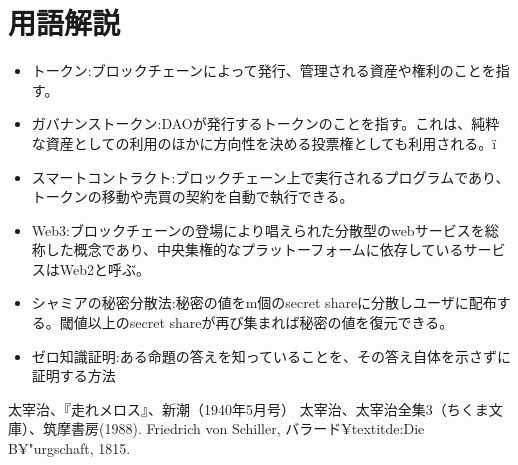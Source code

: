 \documentclass[twocolumn,a4j]{jarticle}
\begin{document}
\section{用語解説}
\begin{itemize}
  \item トークン:ブロックチェーンによって発行、管理される資産や権利のことを指す。
  \item ガバナンストークン:DAOが発行するトークンのことを指す。これは、純粋な資産としての利用のほかに方向性を決める投票権としても利用される。ï
  \item スマートコントラクト:ブロックチェーン上で実行されるプログラムであり、トークンの移動や売買の契約を自動で執行できる。
  \item Web3:ブロックチェーンの登場により唱えられた分散型のwebサービスを総称した概念であり、中央集権的なプラットーフォームに依存しているサービスはWeb2と呼ぶ。
  \item シャミアの秘密分散法:秘密の値をm個のsecret shareに分散しユーザに配布する。閾値以上のsecret shareが再び集まれば秘密の値を復元できる。
  \item ゼロ知識証明:ある命題の答えを知っていることを、その答え自体を示さずに証明する方法
\end{itemize}


\begin{thebibliography}{99}
   太宰治、『走れメロス』、新潮（1940年5月号）
   太宰治、太宰治全集3（ちくま文庫）、筑摩書房(1988).
   Friedrich von Schiller, バラード¥textit{de:Die B¥"{u}rgschaft}, 1815.
\end{thebibliography}
\end{document}
